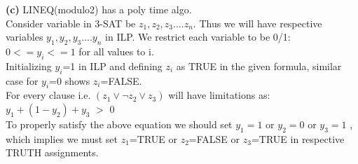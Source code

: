 \documentclass[11pt]{article}
\renewcommand\part[1]{\vspace{.10in}\textbf{(#1)}}
\begin{document}
\part{c}
LINEQ(modulo2) has a poly time algo.
\\ Consider variable in 3-SAT be $z_1,z_2,z_3....z_n$. Thus we will have respective variables $y_1,y_2,y_3....y_n$ in ILP. We restrict each variable to be 0/1:
\\ $0<= y_i<= 1$ for all values to i.
\\ Initializing $y_i$=1 in ILP and defining $z_i$ as TRUE in the given formula, similar case for $y_i$=0 shows $z_i$=FALSE.
\\ For every clause i.e. $(z_{1} \lor \neg z_{2} \lor z_{3})$ will have limitations as:
\\$y_1 + (1-y_2) + y_3$ $>$ 0
\\ To properly satisfy the above equation we should set $y_1=1$ or $y_2=0$ or $y_3=1$ , which implies we must set $z_1$=TRUE or $z_2$=FALSE or $z_3$=TRUE in respective TRUTH assignments.  
\end{document}
